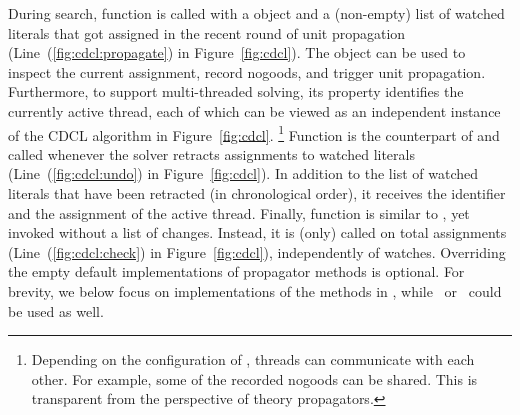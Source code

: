During search, function  is called with a  object
and a (non-empty) list of watched literals that got assigned in the recent round of unit propagation (Line~(\ref{fig:cdcl:propagate}) in Figure~\ref{fig:cdcl}).
The  object can be used to inspect the current assignment, record nogoods, and trigger unit propagation.
Furthermore, to support multi-threaded solving,
its  property identifies the currently active thread,
each of which can be viewed as an independent instance of the CDCL algorithm in Figure~\ref{fig:cdcl}.%
\footnote{%
Depending on the configuration of \clasp, threads can communicate with each other.
For example, some of the recorded nogoods can be shared.
This is transparent from the perspective of theory propagators.}
%
Function  is the counterpart of 
and called whenever the solver retracts assignments to watched literals (Line~(\ref{fig:cdcl:undo}) in Figure~\ref{fig:cdcl}).
In addition to the list of watched literals that have been retracted (in chronological order),
it receives the identifier and the assignment of the active thread.
%
Finally, function  is similar to ,
yet invoked without a list of changes.
Instead, it is (only) called on total assignments
(Line~(\ref{fig:cdcl:check}) in Figure~\ref{fig:cdcl}), independently of watches.
%
Overriding the empty default implementations of propagator methods is optional.
For brevity, we below focus on implementations of the methods in \python,
while \lua\ or \C\ could be used as well.

